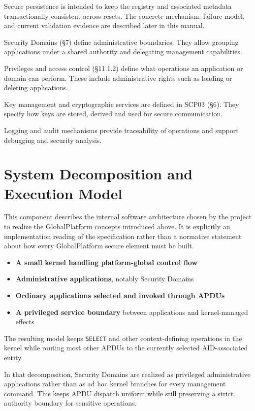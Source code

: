 Secure persistence is intended to keep the registry and associated metadata
transactionally consistent across resets. The concrete mechanism, failure
model, and current validation evidence are described later in this manual.

Security Domains (§7) define administrative boundaries. They allow grouping
applications under a shared authority and delegating management capabilities.

Privileges and access control (§11.1.2) define what operations an application
or domain can perform. These include administrative rights such as loading or
deleting applications.

Key management and cryptographic services are defined in SCP03 (§6). They
specify how keys are stored, derived and used for secure communication.

Logging and audit mechanisms provide traceability of operations and support
debugging and security analysis.

\section{System Decomposition and Execution Model}

This component describes the internal software architecture chosen by the
project to realize the GlobalPlatform concepts introduced above. It is
explicitly an implementation reading of the specification rather than a
normative statement about how every GlobalPlatform secure element must be built.

\begin{itemize}
\item \textbf{A small kernel handling platform-global control flow}
\item \textbf{Administrative applications}, notably Security Domains
\item \textbf{Ordinary applications selected and invoked through APDUs}
\item \textbf{A privileged service boundary} between applications and
  kernel-managed effects
\end{itemize}

The resulting model keeps \texttt{SELECT} and other context-defining
operations in the kernel while routing most other APDUs to the currently
selected AID-associated entity.

In that decomposition, Security Domains are realized as privileged
administrative applications rather than as ad hoc kernel branches for
every management command. This keeps APDU dispatch uniform while still
preserving a strict authority boundary for sensitive operations.

